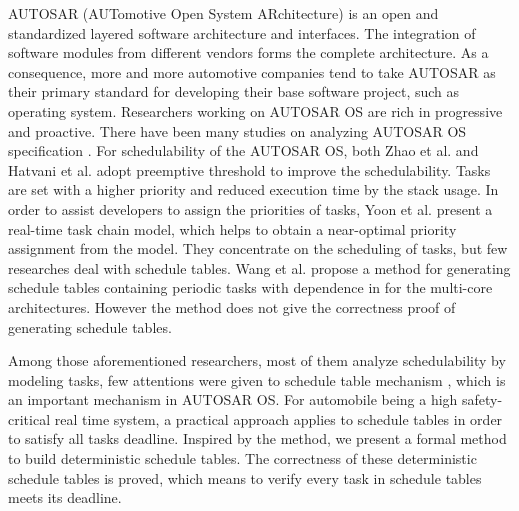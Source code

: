\documentclass[sigconf]{acmart}
\begin{document}
AUTOSAR (AUTomotive Open System ARchitecture) \cite{autosar} is an open and standardized layered software architecture and interfaces. The integration of software modules from different vendors forms the complete architecture. As a consequence, more and more automotive companies tend to take AUTOSAR as their primary standard for developing their base software project, such as operating system. Researchers working on AUTOSAR OS are rich in progressive and proactive. There have been many studies on analyzing AUTOSAR OS specification \cite{DBLP:conf/isorc/AnssiTKGT11}. 
For schedulability of the AUTOSAR OS, both Zhao et al. \cite{DBLP:journals/jsa/ZhaoGZ17} and Hatvani et al. \cite{DBLP:conf/etfa/HatvaniB15} adopt preemptive threshold to improve the schedulability. Tasks are set with a higher priority and reduced execution time by the stack usage. In order to assist developers to assign the priorities of tasks, Yoon et al. \cite{DBLP:conf/racs/YoonR14} present a real-time task chain model, which helps to obtain a near-optimal priority assignment from the model. They concentrate on the scheduling of tasks, but few researches deal with schedule tables. Wang et al. propose a method for generating schedule tables containing periodic tasks with dependence in \cite{DBLP:conf/dasip/WangCM16} for the multi-core architectures. However the method does not give the correctness proof of generating schedule tables.

Among those aforementioned researchers, most of them analyze schedulability by modeling tasks, few attentions were given to schedule table mechanism \cite{autosar}, which is an important mechanism in AUTOSAR OS. For automobile being a high safety-critical real time system, a practical approach \cite{DBLP:journals/rts/BakerS89} applies to schedule tables in order to satisfy all tasks deadline. Inspired by the method, we present a formal method to build deterministic schedule tables. The correctness of these deterministic schedule tables is proved, which means to verify every task in schedule tables meets its deadline.
\end{document}
